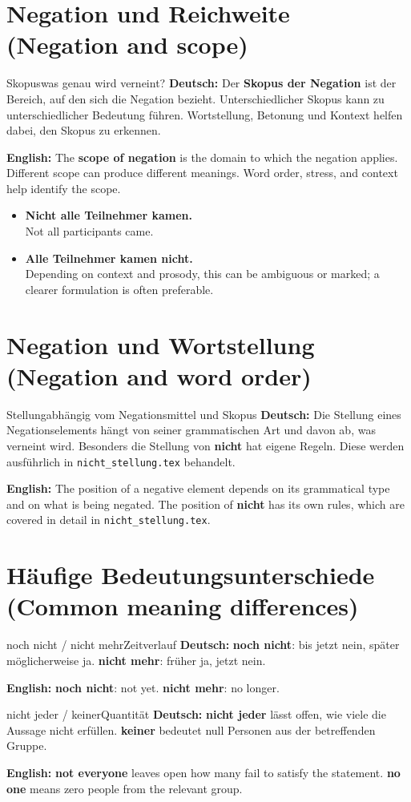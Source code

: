 \documentclass[a4paper,11pt]{article}
\newcommand{\GermanText}[1]{\textbf{Deutsch: }#1\par}
\newcommand{\EnglishText}[1]{{\small\color{SoftGray}\textbf{English: }#1\par}}
\newcommand{\ExampleItem}[2]{\item \textbf{#1}\\{\small\color{SoftGray}#2}}
\begin{document}
\section{Negation und Reichweite \textnormal{(Negation and scope)}}
\begin{grammarentry}{Skopus}{was genau wird verneint?}
\GermanText{Der \textbf{Skopus der Negation} ist der Bereich, auf den sich die Negation bezieht. Unterschiedlicher Skopus kann zu unterschiedlicher Bedeutung führen. Wortstellung, Betonung und Kontext helfen dabei, den Skopus zu erkennen.}
\EnglishText{The \textbf{scope of negation} is the domain to which the negation applies. Different scope can produce different meanings. Word order, stress, and context help identify the scope.}
\end{grammarentry}
\begin{exbox}\begin{itemize}
\ExampleItem{Nicht alle Teilnehmer kamen.}{Not all participants came.}
\ExampleItem{Alle Teilnehmer kamen nicht.}{Depending on context and prosody, this can be ambiguous or marked; a clearer formulation is often preferable.}
\end{itemize}\end{exbox}

\section{Negation und Wortstellung \textnormal{(Negation and word order)}}
\begin{grammarentry}{Stellung}{abhängig vom Negationsmittel und Skopus}
\GermanText{Die Stellung eines Negationselements hängt von seiner grammatischen Art und davon ab, was verneint wird. Besonders die Stellung von \textbf{nicht} hat eigene Regeln. Diese werden ausführlich in \texttt{nicht\_stellung.tex} behandelt.}
\EnglishText{The position of a negative element depends on its grammatical type and on what is being negated. The position of \textbf{nicht} has its own rules, which are covered in detail in \texttt{nicht\_stellung.tex}.}
\end{grammarentry}

\section{Häufige Bedeutungsunterschiede \textnormal{(Common meaning differences)}}
\begin{grammarentry}{noch nicht / nicht mehr}{Zeitverlauf}
\GermanText{\textbf{noch nicht}: bis jetzt nein, später möglicherweise ja. \textbf{nicht mehr}: früher ja, jetzt nein.}
\EnglishText{\textbf{noch nicht}: not yet. \textbf{nicht mehr}: no longer.}
\end{grammarentry}
\begin{grammarentry}{nicht jeder / keiner}{Quantität}
\GermanText{\textbf{nicht jeder} lässt offen, wie viele die Aussage nicht erfüllen. \textbf{keiner} bedeutet null Personen aus der betreffenden Gruppe.}
\EnglishText{\textbf{not everyone} leaves open how many fail to satisfy the statement. \textbf{no one} means zero people from the relevant group.}
\end{grammarentry}
\end{document}
